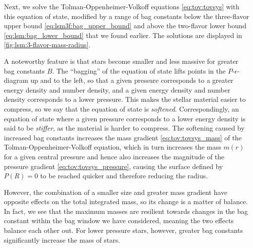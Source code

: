 Next, we solve the Tolman-Oppenheimer-Volkoff equations \eqref{eq:tov:tovsys} with this equation of state,
modified by a range of bag constants below the three-flavor upper bound \eqref{eq:lsm3f:bag_upper_bound} and above the two-flavor lower bound \eqref{eq:lsm:bag_lower_bound} that we found earlier.
The solutions are displayed in \cref{fig:lsm:3-flavor-mass-radius}.

A noteworthy feature is that stars become smaller and less massive for greater bag constants $B$.
The ``bagging''  of the equation of state lifts points in the $P$-$\epsilon$-diagram up and to the left,
so that a given pressure corresponds to a greater energy density and number density, and a given energy density and number density corresponds to a lower pressure.
This makes the stellar material easier to compress, so we say that the equation of state is \emph{softened}.
Correspondingly, an equation of state where a given pressure corresponds to a lower energy density is said to be \emph{stiffer}, as the material is harder to compress.
The softening caused by increased bag constants increases the mass gradient \eqref{eq:tov:tovsys_mass} of the Tolman-Oppenheimer-Volkoff equation,
which in turn increases the mass $m(r)$ for a given central pressure and hence also increases the magnitude of the pressure gradient \eqref{eq:tov:tovsys_pressure},
causing the surface defined by $P(R)=0$ to be reached quicker and therefore reducing the radius.

However, the combination of a smaller size and greater mass gradient have opposite effects on the total integrated mass, so its change is a matter of balance.
In fact, we see that the maximum masses are resilient towards changes in the bag constant within the bag window we have considered, meaning the two effects balance each other out.
For lower pressure stars, however, greater bag constants significantly increase the mass of stars.

